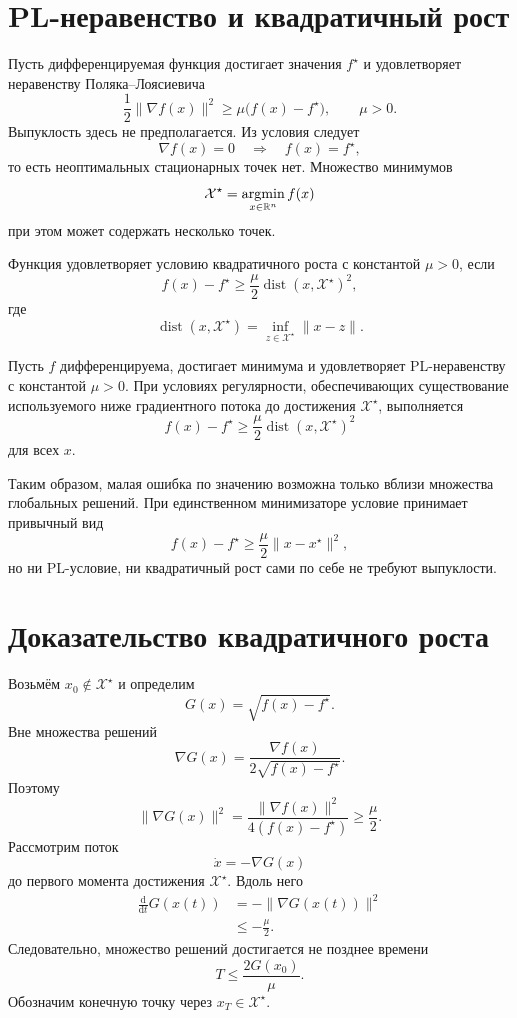 \section{PL-неравенство и квадратичный рост}

Пусть дифференцируемая функция достигает значения \(f^\star\) и
удовлетворяет неравенству Поляка--Лоясиевича
\[
    \frac12\lVert\nabla f(x)\rVert^2
    \ge
    \mu\bigl(f(x)-f^\star\bigr),
    \qquad
    \mu>0.
\]
Выпуклость здесь не предполагается. Из условия следует
\[
    \nabla f(x)=0
    \quad\Longrightarrow\quad
    f(x)=f^\star,
\]
то есть неоптимальных стационарных точек нет. Множество минимумов
\[
    \mathcal X^\star
    =
    \operatorname*{argmin}_{x\in\mathbb{R}^n}f(x)
\]
при этом может содержать несколько точек.

\begin{definition}
Функция удовлетворяет условию квадратичного роста с константой
\(\mu>0\), если
\[
    f(x)-f^\star
    \ge
    \frac\mu2
    \operatorname{dist}(x,\mathcal X^\star)^2,
\]
где
\[
    \operatorname{dist}(x,\mathcal X^\star)
    =
    \inf_{z\in\mathcal X^\star}\lVert x-z\rVert.
\]
\end{definition}

\begin{theorem}
Пусть \(f\) дифференцируема, достигает минимума и удовлетворяет
PL-неравенству с константой \(\mu>0\). При условиях регулярности,
обеспечивающих существование используемого ниже градиентного потока до
достижения \(\mathcal X^\star\), выполняется
\[
    f(x)-f^\star
    \ge
    \frac\mu2
    \operatorname{dist}(x,\mathcal X^\star)^2
\]
для всех \(x\).
\end{theorem}

Таким образом, малая ошибка по значению возможна только вблизи
множества глобальных решений. При единственном минимизаторе условие
принимает привычный вид
\[
    f(x)-f^\star
    \ge
    \frac\mu2\lVert x-x^\star\rVert^2,
\]
но ни PL-условие, ни квадратичный рост сами по себе не требуют
выпуклости.

\section{Доказательство квадратичного роста}

Возьмём \(x_0\notin\mathcal X^\star\) и определим
\[
    G(x)=\sqrt{f(x)-f^\star}.
\]
Вне множества решений
\[
    \nabla G(x)
    =
    \frac{\nabla f(x)}
    {2\sqrt{f(x)-f^\star}}.
\]
Поэтому
\[
    \lVert\nabla G(x)\rVert^2
    =
    \frac{\lVert\nabla f(x)\rVert^2}
    {4(f(x)-f^\star)}
    \ge
    \frac\mu2.
\]
Рассмотрим поток
\[
    \dot x=-\nabla G(x)
\]
до первого момента достижения \(\mathcal X^\star\). Вдоль него
\[
\begin{aligned}
    \frac{\mathrm d}{\mathrm dt}G(x(t))
    &=
    -\lVert\nabla G(x(t))\rVert^2
    \\
    &\le
    -\frac\mu2.
\end{aligned}
\]
Следовательно, множество решений достигается не позднее времени
\[
    T\le\frac{2G(x_0)}\mu.
\]
Обозначим конечную точку через \(x_T\in\mathcal X^\star\).


